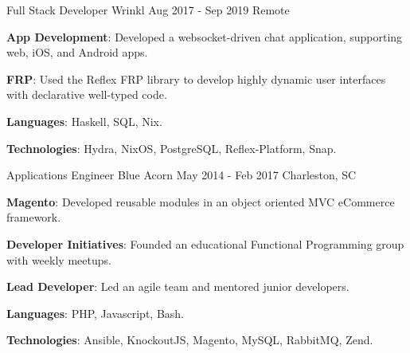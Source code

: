 \begin{cventries}
  \cventry
    {Full Stack Developer}
    {Wrinkl}
    {Aug 2017 - Sep 2019}
    {Remote}
    {
      \begin{cvitems}
        \item {\color{graytext}\textbf{App Development}}: Developed a
          websocket-driven chat application, supporting
          web, iOS, and Android apps.
        \item {\color{graytext}\textbf{FRP}}: Used the Reflex FRP library to
          develop highly dynamic user interfaces with declarative well-typed
          code.
        \item {\color{graytext}\textbf{Languages}}: Haskell, SQL, Nix.
        \item {\color{graytext}\textbf{Technologies}}: Hydra, NixOS, PostgreSQL,
          Reflex-Platform, Snap.
      \end{cvitems}
    }


  \cventry
    {Applications Engineer} %
    {Blue Acorn} %
    {May 2014 - Feb 2017} %
    {Charleston, SC} %
    {
      \begin{cvitems} %
        \item {\color{graytext}\textbf{Magento}}: Developed reusable modules in
          an object oriented MVC eCommerce framework.
        \item {\color{graytext}\textbf{Developer Initiatives}}: Founded an
          educational Functional Programming group with weekly meetups.
        \item {\color{graytext}\textbf{Lead Developer}}: Led an agile team
          and mentored junior developers.
        \item {\color{graytext}\textbf{Languages}}: PHP, Javascript, Bash.
        \item {\color{graytext}\textbf{Technologies}}: Ansible, KnockoutJS, Magento,
          MySQL, RabbitMQ, Zend.
      \end{cvitems}
    }

\end{cventries}
